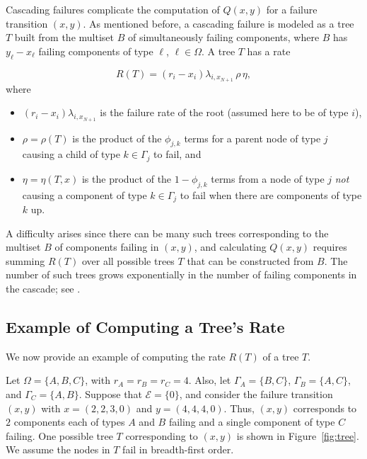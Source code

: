\documentclass[12pt]{article}
\def\myxout{\bgroup \markoverwith{\textcolor{red}{\hbox to.35em{\hss/\hss}}}\ULon}
\newcommand{\deleted}[1]{}
\newcommand{\changed}[1]{#1}
\newcommand{\changed}[1]{\textcolor{red}{#1}}
\newcommand{\deleted}[1]{{\myxout{#1}}}
\begin{document}
Cascading failures complicate the computation of $Q(x, y)$ for a failure transition $(x, y)$. As mentioned before, a cascading failure is modeled as a tree $T$ built from the multiset $B$ of simultaneously failing components, where $B$ has $y_\ell - x_\ell$ failing components of type $\ell$, $\ell \in \Omega$. A tree $T$ has a rate
\changed{
\begin{equation}
\label{eq:rate}
R(T)
=
(r_i - x_i) \lambda_{i,x_{N + 1}}
\, \rho \, \eta,
\end{equation}
where
\begin{itemize}
\item
$(r_i - x_i) \lambda_{i,x_{N + 1}}$
is the failure rate of the root (assumed here to be of type $i$),
%
\item
$\rho = \rho(T)$ is the product of the
$\phi_{j, k}$ terms for a parent node of type $j$ causing a child of type $k \in \Gamma_j$ to fail, and
%
\item
$\eta = \eta(T,x)$ is the product of the $1 - \phi_{j, k}$ terms from a node of type $j$ \textit{not} causing a component of type $k \in \Gamma_j$ to fail when there are components of type $k$ up.
\end{itemize}
}%
A difficulty arises since there can be many such trees corresponding to the multiset $B$ of components failing in $(x, y)$, and calculating $Q(x, y)$ requires summing $R(T)$ over all possible trees $T$ that can be constructed from $B$. The number of such trees grows exponentially in the number of failing components in the cascade; see \cite{ING:2009}.


\subsection{\changed{Example of
Computing a Tree's Rate}}
\label{sec:exrate}

\changed{We now provide an example
of computing the rate $R(T)$
of a tree $T$.}
\deleted{Computing the rate $R(T)$ of a tree $T$ requires that the components fail in a certain order, even though all of the failures occur simultaneously. To see why, consider the following example.}
Let $\Omega = \{ A, B, C \}$, with $r_A = r_B = r_C = 4$. Also, let $\Gamma_A = \{ B, C \}$, $\Gamma_B = \{ A, C \}$, and $\Gamma_C = \{ A, B \}$. Suppose that $\mathcal{E} = \{ 0 \}$, and consider the failure transition $(x, y)$ with $x = (2, 2, 3, 0)$ and $y = (4, 4, 4, 0)$. Thus, $(x, y)$ corresponds to $2$ components each of types $A$ and $B$ failing and a single component of type $C$ failing. One possible tree $T$ corresponding to $(x, y)$ is shown in Figure~\ref{fig:tree}.
\changed{We assume the nodes in $T$ fail in breadth-first order.}
\end{document}
